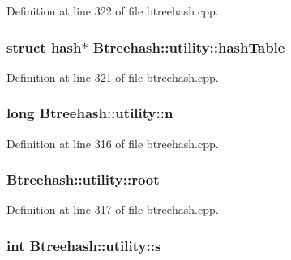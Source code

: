 Definition at line 322 of file btreehash.\-cpp.

\hypertarget{class_btreehash_1_1utility_a71ec64837dc395e06029b8ac3b7a4e29}{
\subsubsection[{hash\-Table}]{\setlength{\rightskip}{0pt plus 5cm}struct {\bf hash}$\ast$ Btreehash\-::utility\-::hash\-Table}}\label{class_btreehash_1_1utility_a71ec64837dc395e06029b8ac3b7a4e29}


Definition at line 321 of file btreehash.\-cpp.

\hypertarget{class_btreehash_1_1utility_a25d061d34055bf9388179dcb996d2dbd}{
\subsubsection[{n}]{\setlength{\rightskip}{0pt plus 5cm}long Btreehash\-::utility\-::n}}\label{class_btreehash_1_1utility_a25d061d34055bf9388179dcb996d2dbd}


Definition at line 316 of file btreehash.\-cpp.

\hypertarget{class_btreehash_1_1utility_ab36d736ef77e71394c00e2fa90865a69}{
\subsubsection[{root}]{ Btreehash\-::utility\-::root}}\label{class_btreehash_1_1utility_ab36d736ef77e71394c00e2fa90865a69}


Definition at line 317 of file btreehash.\-cpp.

\hypertarget{class_btreehash_1_1utility_a382e16d30aee08648096cd0c8770a82e}{
\subsubsection[{s}]{\setlength{\rightskip}{0pt plus 5cm}int Btreehash\-::utility\-::s}}\label{class_btreehash_1_1utility_a382e16d30aee08648096cd0c8770a82e}


